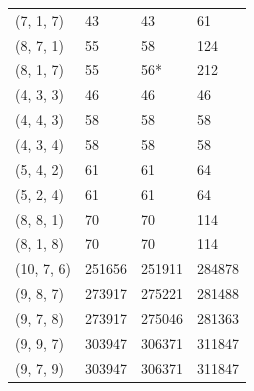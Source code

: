 \documentclass{amsart}
\numberwithin{equation}{section}
\numberwithin{figure}{section}
\numberwithin{table}{section}
\theoremstyle{definition}
\begin{document}
\begin{figure}
\begin{tabular}{|p{2cm}||p{3cm}|p{3cm}|p{3cm}|}
(7, 1, 7)   & 43     & 43     & 61     \\
(8, 7, 1)   & 55     & 58     & 124     \\
(8, 1, 7)   & 55     & 56*     & 212    \\
(4, 3, 3)   & 46     & 46     & 46     \\
(4, 4, 3)   & 58     & 58     & 58     \\
(4, 3, 4)   & 58     & 58     & 58     \\
(5, 4, 2)   & 61     & 61     & 64     \\
(5, 2, 4)   & 61     & 61     & 64     \\
(8, 8, 1)   & 70     & 70     & 114    \\
(8, 1, 8)   & 70     & 70     & 114    \\
\hline
\hline
(10, 7, 6)  & 251656 & 251911 & 284878 \\
(9, 8, 7)   & 273917 & 275221 & 281488 \\
(9, 7, 8)   & 273917 & 275046 & 281363 \\
(9, 9, 7)   & 303947 & 306371 & 311847 \\
(9, 7, 9)   & 303947 & 306371 & 311847 \\
 \hline
\end{tabular}


\end{figure}
\end{document}
